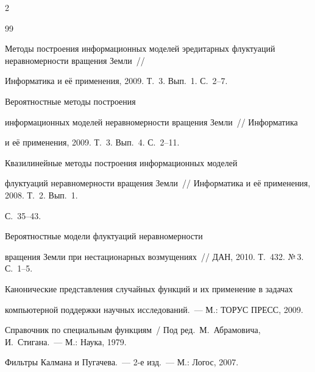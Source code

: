 \begin{multicols}{2}
{{\begin{thebibliography}{99}




Методы построения информационных моделей эредитарных флуктуаций неравномерности вращения Земли~// 


Информатика и её применения, 2009. Т.~3. Вып.~1. С.~2--7.







 Вероятностные методы построения


информационных моделей неравномерности вращения Земли~// Информатика


и её применения, 2009. Т.~3. Вып.~4. С.~2--11.







 Квазилинейные методы построения информационных моделей 


флуктуаций неравномерности вращения Земли~// Информатика и её применения, 2008. Т.~2. Вып.~1. 


С.~35--43.







 Вероятностные модели флуктуаций неравномерности 


вращения Земли при нестационарных возмущениях~// ДАН, 2010. Т.~432. №\,3. С.~1--5.







 Канонические представления случайных функций и их применение в задачах


 компьютерной поддержки научных исследований.~--- М.:  ТОРУС ПРЕСС, 2009.







Справочник по специальным функциям~/ Под ред.\ М.~Абрамовича, И.~Стигана.~--- М.: Наука, 1979.







 Фильтры Калмана и Пугачева.~--- 2-е изд.~--- М.: Логос, 2007.






\end{thebibliography}}}
\end{multicols}
